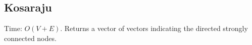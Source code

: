 \subsection{Kosaraju}

Time: $O(V + E)$.
Returns a vector of vectors indicating the directed strongly connected nodes.
